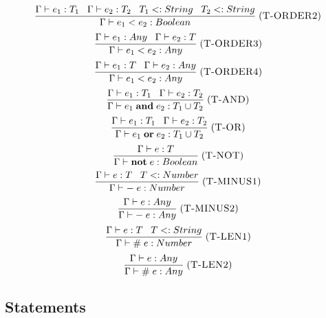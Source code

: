 \documentclass[12pt]{article}
\newcommand{\mylabel}[1]{\; (\textsc{#1})}
\newcommand{\subtype}{<:}
\newcommand{\env}{\Gamma}
\begin{document}
\[
\frac{\env \vdash e_{1}:T_{1} \;\;\; \env \vdash e_{2}:T_{2} \;\;\;
      T_{1} \subtype String \;\;\; T_{2} \subtype String}
     {\env \vdash e_{1} < e_{2} : Boolean}
\mylabel{T-ORDER2}
\]
\[
\frac{\env \vdash e_{1}:Any \;\;\; \env \vdash e_{2}:T}
     {\env \vdash e_{1} < e_{2} : Any}
\mylabel{T-ORDER3}
\]
\[
\frac{\env \vdash e_{1}:T \;\;\; \env \vdash e_{2}:Any}
     {\env \vdash e_{1} < e_{2} : Any}
\mylabel{T-ORDER4}
\]
\[
\frac{\env \vdash e_{1}:T_{1} \;\;\; \env \vdash e_{2}:T_{2}}
     {\env \vdash e_{1} \; \mathbf{and} \; e_{2} : T_{1} \cup T_{2}}
\mylabel{T-AND}
\]
\[
\frac{\env \vdash e_{1}:T_{1} \;\;\; \env \vdash e_{2}:T_{2}}
     {\env \vdash e_{1} \; \mathbf{or} \; e_{2} : T_{1} \cup T_{2}}
\mylabel{T-OR}
\]
\[
\frac{\env \vdash e:T}
     {\env \vdash \mathbf{not} \; e : Boolean}
\mylabel{T-NOT}
\]
\[
\frac{\env \vdash e:T \;\;\; T \subtype Number}
     {\env \vdash - \; e : Number}
\mylabel{T-MINUS1}
\]
\[
\frac{\env \vdash e:Any}
     {\env \vdash - \; e : Any}
\mylabel{T-MINUS2}
\]
\[
\frac{\env \vdash e:T \;\;\; T \subtype String}
     {\env \vdash \# \; e : Number}
\mylabel{T-LEN1}
\]
\[
\frac{\env \vdash e:Any}
     {\env \vdash \# \; e : Any}
\mylabel{T-LEN2}
\]

\subsection{Statements}
\end{document}
